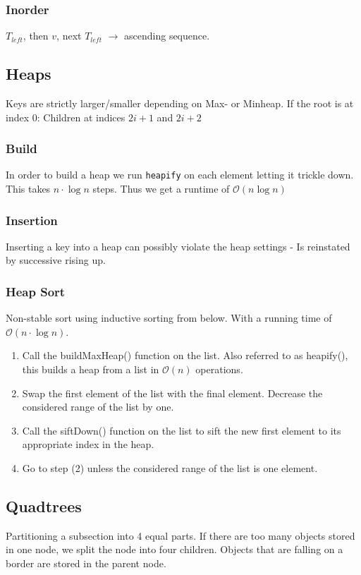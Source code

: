 \documentclass[9pt,landscape,a4paper, table]{extarticle}
\begin{document}
\begin{multicols*}{3}
\subsubsection{Inorder}
$T_{left}$, then $v$, next $T_{left}$ $\rightarrow$ ascending sequence.

\subsection{Heaps}
Keys are strictly larger/smaller depending on Max- or Minheap. If the root is at index $0$: Children at indices $2i + 1$ and $2i + 2$
\subsubsection{Build}
In order to build a heap we run \texttt{heapify} on each element letting it trickle down. This takes $n\cdot \log n$ steps. Thus we get a runtime of $\mathcal{O}(n \log n)$ 
\subsubsection{Insertion}
Inserting a key into a heap can possibly violate the heap settings - Is reinstated by successive rising up. 
\subsubsection{Heap Sort}
Non-stable sort using inductive sorting from below. With a running time of $\mathcal{O}(n\cdot \log n)$.

\begin{enumerate}
    \item Call the buildMaxHeap() function on the list. Also referred to as heapify(), this builds a heap from a list in $\mathcal{O}(n)$ operations.
\item Swap the first element of the list with the final element. Decrease the considered range of the list by one.
\item Call the siftDown() function on the list to sift the new first element to its appropriate index in the heap.
\item Go to step (2) unless the considered range of the list is one element.
\end{enumerate}

\subsection{Quadtrees}
Partitioning a subsection into 4 equal parts. If there are too many objects stored in one node, we split the node into four children. Objects that are falling on a border are stored in the parent node.


\end{multicols*}
\end{document}

